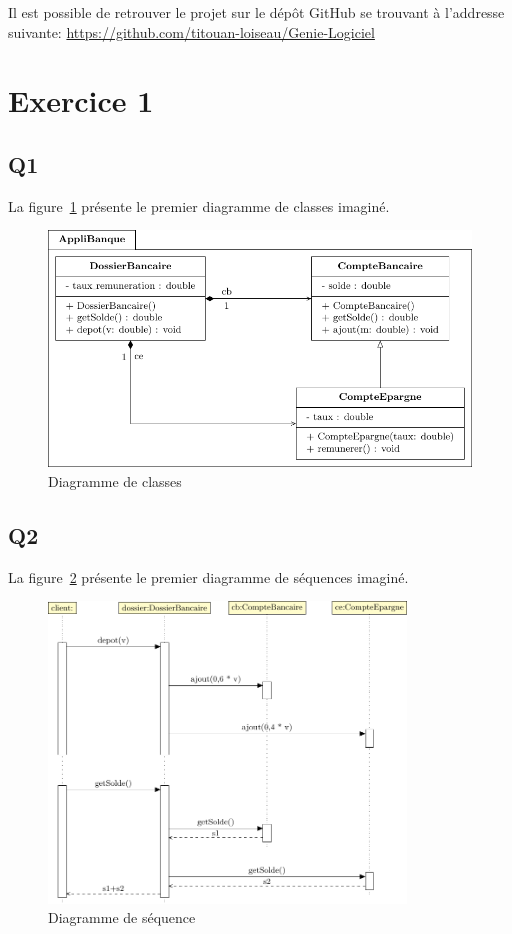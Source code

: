 \documentclass[12pt]{article}
\begin{document}
Il est possible de retrouver le projet sur le dépôt GitHub se trouvant à l'addresse suivante:
\url{https://github.com/titouan-loiseau/Genie-Logiciel}

\section{Exercice 1}
\subsection{Q1}

La figure~\ref{UC1} présente le premier diagramme de classes imaginé. 

\begin{figure}[h]
    \centering
    \includegraphics{Diagrammes/UML_UC1.pdf}
    \caption{Diagramme de classes\label{UC1}}
\end{figure}

\newpage 


\subsection{Q2}

La figure~\ref{US1} présente le premier diagramme de séquences imaginé. 
\begin{figure}[h]
    \centering
    \includegraphics[height=8cm]{Diagrammes/UML_US1.pdf}
    \caption{Diagramme de séquence\label{US1}}
\end{figure}
\end{document}

